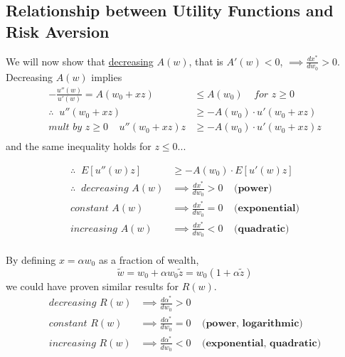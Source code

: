 \documentclass[
14pt,notheorems,hyperref={pdfauthor=whatever}
]{beamer}
\begin{document}
\subsection{Relationship between Utility Functions and Risk Aversion}
\begin{frame}
We will now show that \underline{decreasing} $A(w)$, that is $A'(w) < 0$, $\implies \frac{dx^*}{dw_0}>0$.\\
\hfill \break
Decreasing $A(w)$ implies
\begin{align*}
    -\frac{u''(w)}{u'(w)} = A(w_0+xz) &\leq A(w_0)\;\;\;\;\textit{for $z \geq 0$}\\
    \therefore \;\; u''(w_0+xz) &\geq -A(w_0)\cdot u'(w_0+xz)\\
    \textit{mult by $z \geq 0$} \;\;\;\; u''(w_0+xz)z &\geq -A(w_0)\cdot u'(w_0+xz)z\\
\end{align*}
and the same inequality holds for $z \leq 0$...
\end{frame}

\begin{frame}
\begin{align*}
    \therefore \;\; E[u''(w)z] &\geq -A(w_0)\cdot E[u'(w)z]\\
    \therefore \;\; \textit{decreasing }A(w) &\implies \frac{dx^*}{dw_0}>0 \;\;\;\;\textbf{(power)}\\
    \textit{constant }A(w) &\implies \frac{dx^*}{dw_0}=0 \;\;\;\;\textbf{(exponential)}\\
    \textit{increasing }A(w) &\implies \frac{dx^*}{dw_0}<0 \;\;\;\;\textbf{(quadratic)}\\
\end{align*}
\end{frame}

\begin{frame}
By defining $x = \alpha w_0$ as a fraction of wealth,
\[\tilde w = w_0 + \alpha w_0 \tilde z = w_0(1+\alpha \tilde z)\]
we could have proven similar results for $R(w)$.
\begin{align*}
    \textit{decreasing }R(w) &\implies \frac{d\alpha^*}{dw_0}>0\\
    \textit{constant }R(w) &\implies \frac{d\alpha^*}{dw_0}=0 \;\;\;\;\textbf{(power, logarithmic)}\\
    \textit{increasing }R(w) &\implies \frac{d\alpha^*}{dw_0}<0 \;\;\;\;\textbf{(exponential, quadratic)}\\
\end{align*}
\end{frame}
\end{document}
